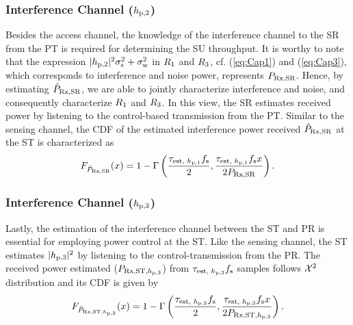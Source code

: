 \subsubsection*{Interference Channel ($h_{\text{p,2}}$)}
Besides the access channel, the knowledge of the interference channel to the SR from the PT is required for determining the SU throughput. It is worthy to note that the expression $|h_{\text{p,2}}|^2 \sigma^2_{\text{s}} + \sigma^2_{\text{w}}$ in $R_{\text{1}}$ and $R_{\text{3}}$, cf. (\ref{eq:Cap1}) and (\ref{eq:Cap3}), which corresponds to interference and noise power, represents $P_{\text{Rx,SR}}$. Hence, by estimating $\hat{P}_{\text{Rx,SR}}$, we are able to jointly characterize interference and noise, and consequently characterize $R_{\text{1}}$ and $R_{\text{3}}$.  
In this view, the SR estimates received power by listening to the control-based transmission from the PT. Similar to the sensing channel, the CDF of the estimated interference power received $\hat{P}_{\text{Rx,SR}}$ at the ST is characterized as
\begin{align}
F_{\hat{P}_{\text{Rx,SR}}}(x) = 1 - \Gamma \left( \frac{\tau_{\text{est, $h_{\text{p,1}}$}} f_{\text{s}}}{2}, \frac{\tau_{\text{est, $h_{\text{p,1}}$}} f_{\text{s}} x}{2 P_{\text{Rx,SR}}} \right) \label{eq:fprcvdsr}.
\end{align}

  

\subsubsection*{Interference Channel ($h_{\text{p,3}}$)}
Lastly, the estimation of the interference channel between the ST and PR is essential for employing power control at the ST. Like the sensing channel, the ST estimates $|h_{\text{p,3}}|^2$ by listening to the control-transmission from the PR. The received power estimated ($P_{\text{Rx,ST,$h_{\text{p,3}}$}}$) from $\tau_{\text{est, $h_{\text{p,3}}$}} f_{\text{s}}$ samples follows $\cchi2$ distribution and its CDF is given by  
\begin{align}
F_{\hat{P}_{\text{Rx,ST,$h_{\text{p,3}}$}}}(x) = 1 - \Gamma \left( \frac{\tau_{\text{est, $h_{\text{p,3}}$}} f_{\text{s}}}{2}, \frac{\tau_{\text{est, $h_{\text{p,3}}$}} f_{\text{s}} x}{2 P_{\text{Rx,ST,$h_{\text{p,3}}$}}} \right) \label{eq:fprcvdstpr}.
\end{align}

